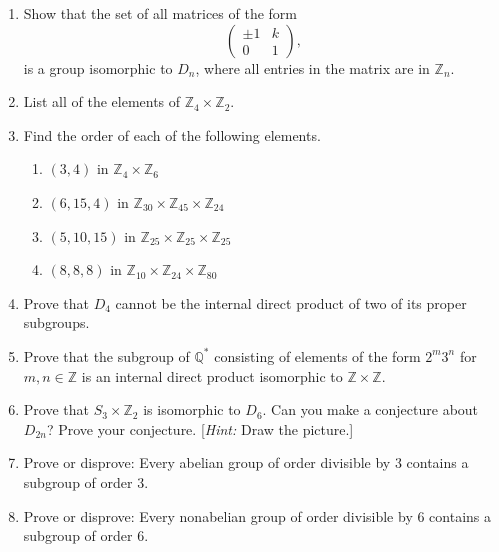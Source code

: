{\begin{enumerate}
\item
Show that the set of all matrices of the form
\[
\begin{pmatrix}
\pm 1 & k\\
0 & 1
\end{pmatrix},
\]
is a group isomorphic to $D_n$, where all entries in the matrix are in ${\mathbb Z}_n$.

 

\item
List all of the elements of ${\mathbb Z}_4 \times {\mathbb Z}_2$.
 

\item
Find the order of each of the following elements.

\begin{enumerate}
 
 \item
$(3, 4)$ in ${\mathbb Z}_4 \times {\mathbb Z}_6$

 \item
$(6, 15, 4)$ in ${\mathbb Z}_{30} \times {\mathbb Z}_{45} \times {\mathbb
Z}_{24}$

 \item
$(5, 10, 15)$ in ${\mathbb Z}_{25} \times {\mathbb Z}_{25} \times {\mathbb
Z}_{25}$

 \item
$(8, 8, 8)$ in ${\mathbb Z}_{10} \times {\mathbb Z}_{24} \times {\mathbb
Z}_{80}$
 
\end{enumerate}
 

\item
Prove that $D_4$ cannot be the internal direct product of two of its
proper subgroups. 
 

\item
Prove that the subgroup of ${\mathbb Q}^\ast$ consisting of elements of
the form $2^m 3^n$ for $m,n \in {\mathbb Z}$ is an internal direct
product isomorphic to ${\mathbb Z} \times {\mathbb Z}$.
 

\item
Prove that $S_3 \times {\mathbb Z}_2$ is isomorphic to $D_6$. Can you
make a conjecture about $D_{2n}$? Prove your conjecture. [{\em Hint:\/}
Draw the picture.] 
 

\item
Prove or disprove: Every abelian group of order divisible by 3
contains a subgroup of order 3.  


\item
Prove or disprove: Every nonabelian group of order divisible by 6
contains a subgroup of order 6. 
 


\end{enumerate}}
